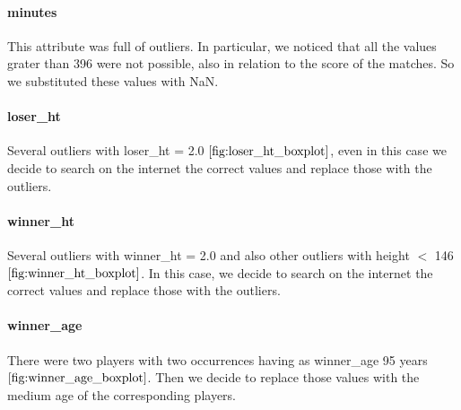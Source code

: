 \documentclass{article}
\begin{document}
\paragraph{minutes}
This attribute was full of outliers. In particular, we noticed that all the values grater than 396 were not possible, also in relation to the score of the matches. So we substituted these values with NaN.

\paragraph{loser\_ht}
Several outliers with loser\_ht = 2.0 $\ref{fig:loser_ht_boxplot}$, even in this case we decide to search on the internet the correct values and replace those with the outliers. 

\paragraph{winner\_ht}
Several outliers with winner\_ht = 2.0 and also other outliers with height $<$ 146 $\ref{fig:winner_ht_boxplot}$. In this case, we decide to search on the internet the correct values and replace those with the outliers.

\paragraph{winner\_age}
There were two players with two occurrences having as winner\_age 95 years $\ref{fig:winner_age_boxplot}$. Then we decide to replace those values with the medium age of the corresponding players.
\end{document}
